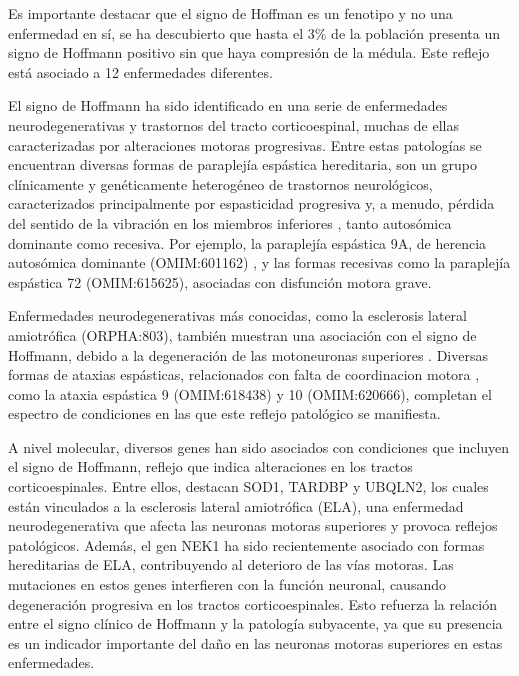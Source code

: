 Es importante destacar que el signo de Hoffman es un fenotipo y no una enfermedad en sí, se ha descubierto que hasta el 3\% de la población presenta un signo de Hoffmann positivo sin que haya compresión de la médula. Este reflejo está asociado a 12 enfermedades diferentes\cite{whitney}.

El signo de Hoffmann ha sido identificado en una serie de enfermedades neurodegenerativas y trastornos del tracto corticoespinal, muchas de ellas caracterizadas por alteraciones motoras progresivas. Entre estas patologías se encuentran diversas formas de paraplejía espástica hereditaria, son un grupo clínicamente y genéticamente heterogéneo de trastornos neurológicos, caracterizados principalmente por espasticidad progresiva y, a menudo, pérdida del sentido de la vibración en los miembros inferiores \cite{Esteves2014}, tanto autosómica dominante como recesiva. Por ejemplo, la paraplejía espástica 9A, de herencia autosómica dominante (OMIM:601162) \cite{10.1093/brain/awv143}, y las formas recesivas como la paraplejía espástica 72 (OMIM:615625), asociadas con disfunción motora grave.

Enfermedades neurodegenerativas más conocidas, como la esclerosis lateral amiotrófica (ORPHA:803), también muestran una asociación con el signo de Hoffmann, debido a la degeneración de las motoneuronas superiores \cite{RIANCHO201927}. Diversas formas de ataxias espásticas, relacionados con falta de coordinacion motora \cite{Pedroso2022}, como la ataxia espástica 9 (OMIM:618438) y 10 (OMIM:620666), completan el espectro de condiciones en las que este reflejo patológico se manifiesta.

A nivel molecular, diversos genes han sido asociados con condiciones que incluyen el signo de Hoffmann, reflejo que indica alteraciones en los tractos corticoespinales. Entre ellos, destacan SOD1, TARDBP y UBQLN2, los cuales están vinculados a la esclerosis lateral amiotrófica (ELA), una enfermedad neurodegenerativa que afecta las neuronas motoras superiores y provoca reflejos patológicos. Además, el gen NEK1 ha sido recientemente asociado con formas hereditarias de ELA, contribuyendo al deterioro de las vías motoras. Las mutaciones en estos genes interfieren con la función neuronal, causando degeneración progresiva en los tractos corticoespinales. Esto refuerza la relación entre el signo clínico de Hoffmann y la patología subyacente, ya que su presencia es un indicador importante del daño en las neuronas motoras superiores en estas enfermedades.